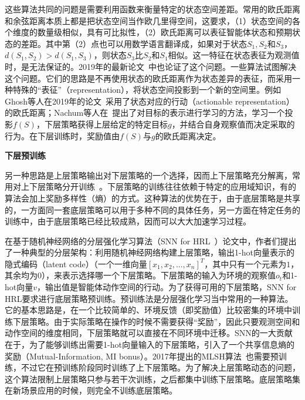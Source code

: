 这些算法共同的问题是需要利用函数来衡量特定的状态空间差距。常用的欧氏距离和余弦距离本质上都是把状态空间当作欧几里得空间，这要求，（1）状态空间的各个维度的数量级相似，具有可比拟性，（2）欧氏距离可以表征智能体状态和预期状态的差距。其中第（2）点也可以用数学语言翻译成，如果对于状态$S_1, S_2$和$S_3$，$d(S_1, S_2) > d(S_1, S_3)$，则状态$S_3$比$S_2$和$S_1$相似。这一特征在状态表征为观测值时，是无法保证的。2019年的最新论文~\cite{goal-conditioned}中也论证了这个问题。一些算法试图解决这个问题。它们的思路是不再使用状态的欧氏距离作为状态差异的表征，而采用一种特殊的``表征''（representation），将状态空间投影到一个新的空间里。例如Ghosh等人在2019年的论文~采用了状态对应的行动（actionable representation）的欧氏距离；Nachum等人在~\cite{goal_repr_learning}提出了对目标的表示进行学习的方法，学习一个投影$f(S)$，下层策略获得上层给定的特定目标$g$，并结合自身观察值而决定采取的行为。在下层训练时，奖励值由$f(S)$与$g$的欧氏距离决定。

\textbf{下层预训练}

另一种思路是上层策略输出对下层策略的一个选择，因而上下层策略充分解离，常用对上下层策略分开训练~\cite{DIYAN, SNN4hrl, Learning_and_Transfer_of_Modulated_Locomotor_Controllers}。下层策略的训练往往依赖于特定的应用域知识，有的算法会加上奖励多样性（熵）的方式。这种算法的优势在于，由于底层策略是共享的，一方面同一套底层策略可以用于多种不同的具体任务，另一方面在特定任务的训练中，由于底层策略已经比较成熟，因而可以大大加速学习过程。

在基于随机神经网络的分层强化学习算法（SNN for HRL~\cite{SNN4hrl}）论文中，作者们提出了一种典型的分层架构：利用随机神经网络构建上层策略，输出1-hot向量表示的隐式编码（latent code）（一个一维向量$[x_1, x_2, ..., x_n]^T$，其中只有一个元素为$1$，其余均为$0$），来表示选择哪一个下层策略。下层策略的输入为环境的观察值$o_t$和1-hot向量$v$，输出值是智能体动作空间的行动。为了获得可用的下层策略，SNN for HRL要求进行底层策略预训练。预训练法是分层强化学习当中常用的一种算法。它的基本思路是，在一个比较简单的、环境反馈（即奖励值）比较密集的环境中训练下层策略。由于实际策略在操作的时候不需要获得``奖励''，因此只要观测空间和动作空间的维度相同，下层策略就可以直接在不同环境中迁移。SNN的一大贡献在于，为了能够训练出需要1-hot向量输入的下层策略，引入了一个共享信息熵的奖励（Mutual-Information, MI bonus）。2017年提出的MLSH算法~\cite{MLSH}也需要预训练，不过它在预训练阶段同时训练了上下层策略。为了解决上层策略动态的问题，这个算法限制上层策略只参与若干次训练，之后都集中训练下层策略。底层策略集在新场景应用的时候，则完全不训练底层策略。

